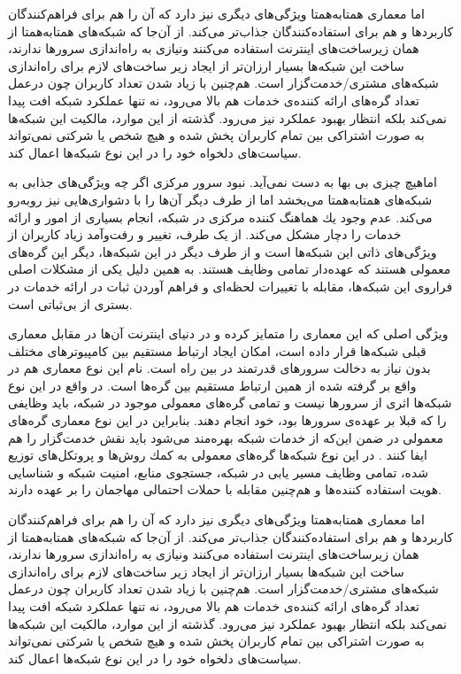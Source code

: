 \documentclass[12pt,twoside]{xepersian-magazine}
\begin{document}
\begin{article}{2}
اما معماری همتابه‌همتا ويژگی‌های ديگری نيز دارد که آن را هم برای فراهم‌کنندگان کاربردها و هم برای استفاده‌کنندگان جذاب‌تر می‌کند.  از آن‌جا که شبکه‌های همتابه‌همتا از همان زيرساخت‌های اينترنت استفاده می‌کنند ونيازی به راه‌اندازی سرورها ندارند، ساخت اين شبكه‌ها بسيار ارزان‌تر از ايجاد زير ساخت‌های لازم برای راه‌اندازی شبكه‌های مشتری/خدمت‌گزار است.  هم‌چنين با زياد شدن تعداد کاربران چون درعمل تعداد گره‌های ارائه کننده‌ی خدمات هم بالا می‌رود، نه تنها عملكرد شبكه افت پيدا نمی‌كند بلكه انتظار بهبود عملکرد نيز می‌رود. گذشته از اين موارد، مالكيت اين شبكه‌ها به صورت اشتراكی بين تمام کاربران پخش شده و هيچ شخص يا شركتی نمی‌تواند سياست‌های دلخواه خود را در اين نوع شبكه‌ها اعمال کند.

اماهيچ چيزی بی‌ بها به دست نمی‌آید. نبود سرور مرکزی اگر چه  ويژگی‌های جذابی به شبکه‌های همتابه‌همتا می‌بخشد اما از طرف ديگر آن‌ها را با دشواری‌هايی نيز روبه‌رو می‌کند.  عدم وجود يك هماهنگ كننده مركزی در شبكه، انجام بسياری از امور و ارائه خدمات را  دچار مشكل می‌کند.  از يک طرف، تغيير و رفت‌وآمد زیاد کاربران از ويژگی‌های ذاتی اين شبکه‌ها است و از طرف ديگر در اين شبكه‌ها، ديگر اين گره‌های معمولی  هستند كه  عهده‌دار تمامی وظايف هستند. به همين دلیل يکی از مشکلات اصلی فراروی اين شبكه‌ها، مقابله با  تغييرات لحظه‌ای و فراهم آوردن ثبات در ارائه  خدمات در بستری از بی‌ثباتی است.  


ويژگی اصلی که اين معماری را متمايز کرده و در دنيای اينترنت آن‌ها در مقابل معماری قبلی شبكه‌ها قرار داده است، امكان ايجاد ارتباط مستقيم  بين كامپيوترهای مختلف بدون نياز به دخالت سرورهای قدرتمند در بين راه است.  نام‌ اين نوع معماری هم در واقع بر گرفته شده از همین  ارتباط مستقیم بين گره‌ها است.  در واقع در اين نوع شبكه‌ها اثری از سرورها نيست و تمامی گره‌های معمولی موجود در شبكه، بايد وظايفی را که قبلا بر عهده‌ی سرورها بود، خود انجام دهند. بنابراين در اين نوع معماری گره‌های معمولی در ضمن اين‌که از خدمات شبکه بهره‌مند می‌شود بايد نقش خدمت‌گزار را هم ايفا کنند . در اين نوع شبکه‌ها گره‌های معمولی به كمك روش‌ها و پروتكل‌های توزيع شده، تمامی وظايف  مسير يابی در شبكه، جستجوی منابع، امنيت شبكه و شناسايی هويت استفاده كننده‌ها و هم‌چنين مقابله با حملات احتمالی مهاجمان را بر عهده دارند.

اما معماری همتابه‌همتا ويژگی‌های ديگری نيز دارد که آن را هم برای فراهم‌کنندگان کاربردها و هم برای استفاده‌کنندگان جذاب‌تر می‌کند.  از آن‌جا که شبکه‌های همتابه‌همتا از همان زيرساخت‌های اينترنت استفاده می‌کنند ونيازی به راه‌اندازی سرورها ندارند، ساخت اين شبكه‌ها بسيار ارزان‌تر از ايجاد زير ساخت‌های لازم برای راه‌اندازی شبكه‌های مشتری/خدمت‌گزار است.  هم‌چنين با زياد شدن تعداد کاربران چون درعمل تعداد گره‌های ارائه کننده‌ی خدمات هم بالا می‌رود، نه تنها عملكرد شبكه افت پيدا نمی‌كند بلكه انتظار بهبود عملکرد نيز می‌رود. گذشته از اين موارد، مالكيت اين شبكه‌ها به صورت اشتراكی بين تمام کاربران پخش شده و هيچ شخص يا شركتی نمی‌تواند سياست‌های دلخواه خود را در اين نوع شبكه‌ها اعمال کند.


\end{article}
\end{document}

